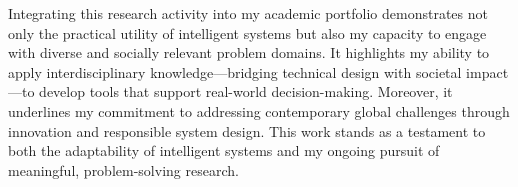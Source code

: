 Integrating this research activity into my academic portfolio demonstrates not only the practical utility of intelligent systems but also my capacity to engage with diverse and socially relevant problem domains. It highlights my ability to apply interdisciplinary knowledge—bridging technical design with societal impact—to develop tools that support real-world decision-making. Moreover, it underlines my commitment to addressing contemporary global challenges through innovation and responsible system design. This work stands as a testament to both the adaptability of intelligent systems and my ongoing pursuit of meaningful, problem-solving research.